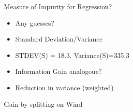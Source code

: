 \documentclass[usenames,dvipsnames]{beamer}
\begin{document}
\begin{frame}{Measure of Impurity for Regression?}
\begin{itemize}
	\item \pause Any guesses?
	\item \pause Standard Deviation/Variance
	\item \pause STDEV(S) = 18.3, Variance(S)=335.3
	\item \pause Information Gain analogoue?
	\item \pause Reduction in variance (weighted)
\end{itemize}

\end{frame}

\begin{frame}{Gain by splitting on Wind}
\begin{columns}

\begin{column}{.5\textwidth}
	\begin{scriptsize}


\end{scriptsize}
\end{column}
\end{columns}
\end{frame}
\end{document}
